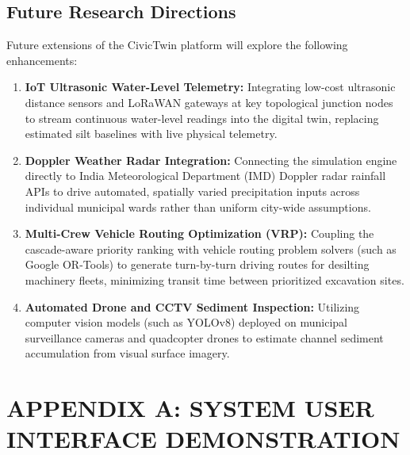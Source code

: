 \documentclass[12pt,a4paper]{report}
\begin{document}
\section{Future Research Directions}
Future extensions of the CivicTwin platform will explore the following enhancements:
\begin{enumerate}
    \item \textbf{IoT Ultrasonic Water-Level Telemetry:} Integrating low-cost ultrasonic distance sensors and LoRaWAN gateways at key topological junction nodes to stream continuous water-level readings into the digital twin, replacing estimated silt baselines with live physical telemetry.
    \item \textbf{Doppler Weather Radar Integration:} Connecting the simulation engine directly to India Meteorological Department (IMD) Doppler radar rainfall APIs to drive automated, spatially varied precipitation inputs across individual municipal wards rather than uniform city-wide assumptions.
    \item \textbf{Multi-Crew Vehicle Routing Optimization (VRP):} Coupling the cascade-aware priority ranking with vehicle routing problem solvers (such as Google OR-Tools) to generate turn-by-turn driving routes for desilting machinery fleets, minimizing transit time between prioritized excavation sites.
    \item \textbf{Automated Drone and CCTV Sediment Inspection:} Utilizing computer vision models (such as YOLOv8) deployed on municipal surveillance cameras and quadcopter drones to estimate channel sediment accumulation from visual surface imagery.
\end{enumerate}



\clearpage
\singlespacing


\onehalfspacing

\clearpage
\pagestyle{empty}

\chapter*{APPENDIX A: SYSTEM USER INTERFACE DEMONSTRATION}
\end{document}
